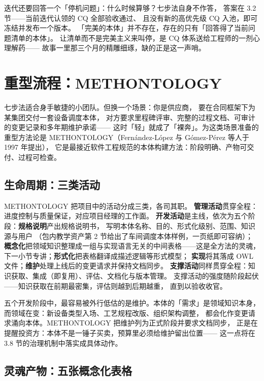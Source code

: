 迭代还要回答一个「停机问题」：什么时候算够？七步法自身不作答，
答案在 3.2 节——当前迭代认领的 CQ 全部验收通过、
且没有新的高优先级 CQ 入池，即可冻结并发布一个版本。
「完美的本体」并不存在，存在的只有「回答得了当前问题清单的本体」。
让清单而不是完美主义来叫停，是 CQ 体系送给工程师的一剂心理解药——
故事一里那三个月的精雕细琢，缺的正是这一声哨。

\section{重型流程：METHONTOLOGY}

七步法适合身手敏捷的小团队。但换一个场景：你是供应商，
要在合同框架下为某集团交付一套设备调度本体，
对方要求里程碑评审、完整的过程文档、可审计的变更记录和多年期维护承诺——
这时「轻」就成了「裸奔」。为这类场景准备的重型方法论是
METHONTOLOGY（Fern\'andez-L\'opez 与 G\'omez-P\'erez 等人于 1997 年提出），
它是最接近软件工程规范的本体构建方法：阶段明确、产物可交付、过程可检查。

\subsection{生命周期：三类活动}

METHONTOLOGY 把项目中的活动分成三类，各司其职。
\textbf{管理活动}贯穿全程：进度控制与质量保证，对应项目经理的工作面。
\textbf{开发活动}是主线，依次为五个阶段：\textbf{规格说明}产出规格说明书，
写明本体名称、目的、形式化级别、范围、知识源与用户
（包内教学资产第 2 节给出了车间调度本体样例，一页纸即可容纳）；
\textbf{概念化}把领域知识整理成一组与实现语言无关的中间表格——这是全方法的灵魂，
下一小节专讲；\textbf{形式化}把表格翻译成描述逻辑等形式模型；
\textbf{实现}将其落成 OWL 文件；\textbf{维护}处理上线后的变更请求并保持文档同步。
\textbf{支撑活动}同样贯穿全程：知识获取、集成（即复用）、评估、文档化与版本管理。
支撑活动的强度随阶段起伏——知识获取在前期最密集，评估则越到后期越重，
直到以验收收官。

五个开发阶段中，最容易被外行低估的是维护。本体的「需求」是领域知识本身，
而领域在变：新设备类型入场、工艺规程改版、组织架构调整，
都会化作变更请求涌向本体。METHONTOLOGY 把维护列为正式阶段并要求文档同步，
正是在提醒投资方：本体不是一锤子买卖，预算里必须给维护留出位置——
这一点将在 3.8 节的治理机制中落实成具体动作。

\subsection{灵魂产物：五张概念化表格}

